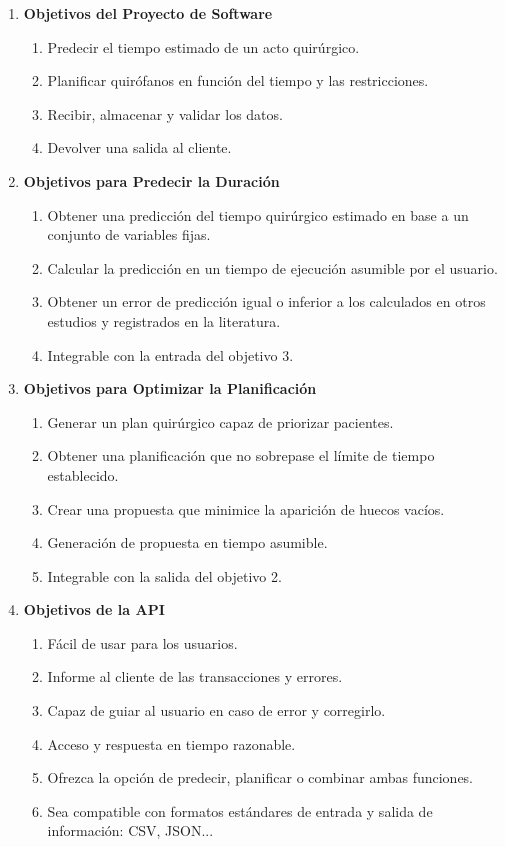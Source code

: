 \begin{enumerate}
    \item \textbf{Objetivos del Proyecto de Software} 
\begin{enumerate}
        \item Predecir el tiempo estimado de un acto quirúrgico.
        \item Planificar quirófanos en función del tiempo y las restricciones.
        \item Recibir, almacenar y validar los datos.
        \item Devolver una salida al cliente.
    \end{enumerate}
    \item \textbf{Objetivos para Predecir la Duración}
\begin{enumerate}
    \item Obtener una predicción del tiempo quirúrgico estimado en base a un conjunto de variables fijas.
    \item Calcular la predicción en un tiempo de ejecución asumible por el usuario.
    \item Obtener un error de predicción igual o inferior a los calculados en otros estudios y registrados en la literatura.
    \item Integrable con la entrada del objetivo 3.
\end{enumerate}
\item \textbf{Objetivos para Optimizar la Planificación}
        \begin{enumerate}
            \item Generar un plan quirúrgico capaz de priorizar pacientes.
            \item Obtener una planificación que no sobrepase el límite de tiempo establecido.
            \item Crear una propuesta que minimice la aparición de huecos vacíos.
            \item Generación de propuesta en tiempo asumible.
            \item Integrable con la salida del objetivo 2.
        \end{enumerate}
        \item \textbf{Objetivos de la API}
        \begin{enumerate}
            \item Fácil de usar para los usuarios.
            \item Informe al cliente de las transacciones y errores.
            \item Capaz de guiar al usuario en caso de error y corregirlo.
            \item Acceso y respuesta en tiempo razonable.
            \item Ofrezca la opción de predecir, planificar o combinar ambas funciones.
            \item Sea compatible con formatos estándares de entrada y salida de información: CSV, JSON...
            \end{enumerate}
            \end{enumerate}


